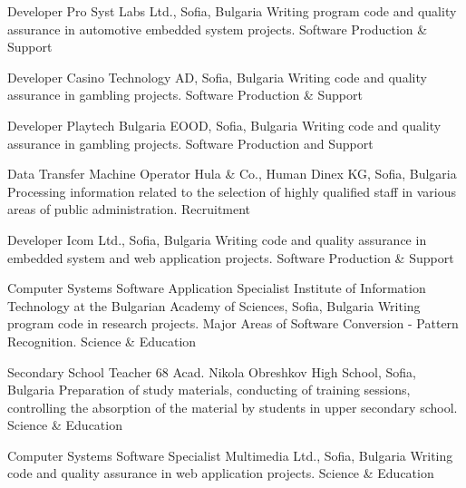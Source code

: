 \documentclass[english,a4paper]{europasscv}
\begin{document}
\begin{europasscv}
   {Developer}
  \ecvitem {} {Pro Syst Labs Ltd., Sofia, Bulgaria}
  \ecvitem {} {Writing program code and quality assurance in automotive embedded system projects.}
  \ecvitem {} { \quad Software Production \& Support}
  
   {Developer}
  \ecvitem {} {Casino Technology AD, Sofia, Bulgaria}
  \ecvitem {} {Writing code and quality assurance in gambling projects.}
  \ecvitem {} { \quad Software Production \& Support}

   {Developer}
  \ecvitem {} {Playtech Bulgaria EOOD, Sofia, Bulgaria}
  \ecvitem {} {Writing code and quality assurance in gambling projects.}
  \ecvitem {} { \quad Software Production and Support}
  
   {Data Transfer Machine Operator}
  \ecvitem {} {Hula \& Co., Human Dinex KG, Sofia, Bulgaria}
  \ecvitem {} {Processing information related to the selection of highly qualified staff in various areas of public administration.}
  \ecvitem {} { \quad Recruitment}
  
   {Developer}
  \ecvitem {} {Icom Ltd., Sofia, Bulgaria}
  \ecvitem {} {Writing code and quality assurance in embedded system and web application projects.}
  \ecvitem {} { \quad Software Production \& Support}

   {Computer Systems Software Application Specialist}
  \ecvitem {} {Institute of Information Technology at the Bulgarian Academy of Sciences, Sofia, Bulgaria}
  \ecvitem {} {Writing program code in research projects. Major Areas of Software Conversion - Pattern Recognition.}
  \ecvitem {} { \quad Science \& Education}
  
   {Secondary School Teacher}
  \ecvitem {} {68 Acad. Nikola Obreshkov High School, Sofia, Bulgaria}
  \ecvitem {} {Preparation of study materials, conducting of training sessions, controlling the absorption of the material by students in upper secondary school.}
  \ecvitem {} { \quad Science \& Education}
  
   {Computer Systems Software Specialist}
  \ecvitem {} {Multimedia Ltd., Sofia, Bulgaria}
  \ecvitem {} {Writing code and quality assurance in web application projects.}
  \ecvitem {} { \quad Science \& Education}
  

\end{europasscv}
\end{document}
